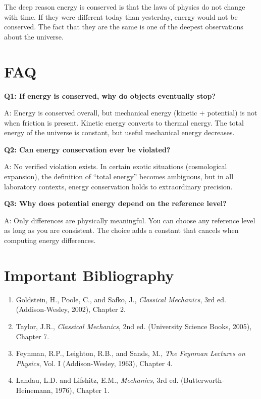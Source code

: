 \documentclass[11pt,openright]{book}
\begin{document}
The deep reason energy is conserved is that the laws of physics do not change with time. If they were different today than yesterday, energy would not be conserved. The fact that they are the same is one of the deepest observations about the universe.


\section*{FAQ}

\textbf{Q1: If energy is conserved, why do objects eventually stop?}

A: Energy is conserved overall, but mechanical energy (kinetic + potential) is not when friction is present. Kinetic energy converts to thermal energy. The total energy of the universe is constant, but useful mechanical energy decreases.

\textbf{Q2: Can energy conservation ever be violated?}

A: No verified violation exists. In certain exotic situations (cosmological expansion), the definition of ``total energy'' becomes ambiguous, but in all laboratory contexts, energy conservation holds to extraordinary precision.

\textbf{Q3: Why does potential energy depend on the reference level?}

A: Only differences are physically meaningful. You can choose any reference level as long as you are consistent. The choice adds a constant that cancels when computing energy differences.
\section*{Important Bibliography}

\begin{enumerate}
\item Goldstein, H., Poole, C., and Safko, J., \textit{Classical Mechanics}, 3rd ed. (Addison-Wesley, 2002), Chapter 2.
\item Taylor, J.R., \textit{Classical Mechanics}, 2nd ed. (University Science Books, 2005), Chapter 7.
\item Feynman, R.P., Leighton, R.B., and Sands, M., \textit{The Feynman Lectures on Physics}, Vol. I (Addison-Wesley, 1963), Chapter 4.
\item Landau, L.D. and Lifshitz, E.M., \textit{Mechanics}, 3rd ed. (Butterworth-Heinemann, 1976), Chapter 1.
\end{enumerate}
\end{document}

